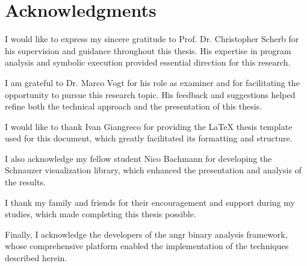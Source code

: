 \chapter{Acknowledgments}

I would like to express my sincere gratitude to Prof. Dr. Christopher Scherb for his supervision and guidance throughout this thesis. His expertise in program analysis and symbolic execution provided essential direction for this research.

I am grateful to Dr. Marco Vogt for his role as examiner and for facilitating the opportunity to pursue this research topic. His feedback and suggestions helped refine both the technical approach and the presentation of this thesis.

I would like to thank Ivan Giangreco for providing the LaTeX thesis template used for this document, which greatly facilitated its formatting and structure.

I also acknowledge my fellow student Nico Bachmann for developing the Schnauzer visualization library, which enhanced the presentation and analysis of the results.

I thank my family and friends for their encouragement and support during my studies, which made completing this thesis possible.

Finally, I acknowledge the developers of the angr binary analysis framework, whose comprehensive platform enabled the implementation of the techniques described herein.
